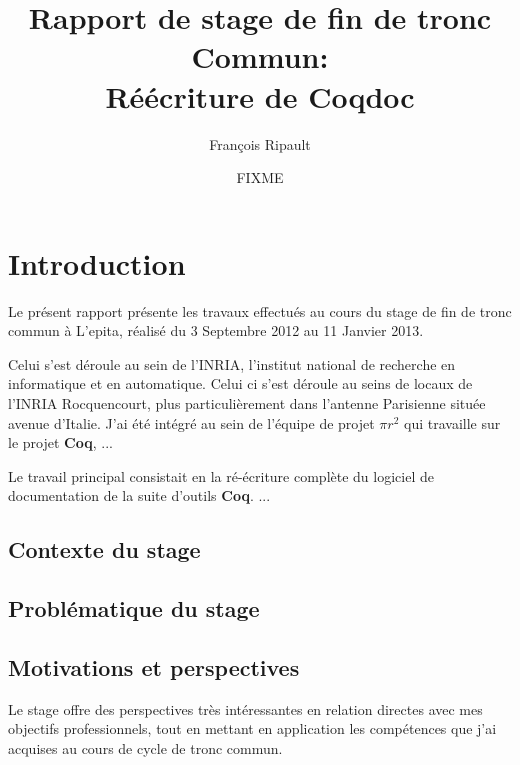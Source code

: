 \documentclass[a4paper, 11pt]{report}
\title{Rapport de stage de fin de tronc Commun: \\
  Réécriture de Coqdoc}
\author{François Ripault}
\date{FIXME}
\newcommand{\pir}[0]{\xspace\textbf{$\pi r^2$}\xspace}
\newcommand{\coq}[0]{\xspace\textbf{Coq}\xspace}
\begin{document}
\maketitle
\thispagestyle{empty}

\tableofcontents
\thispagestyle{empty}

\setcounter{page}{0}
\chapter{Introduction}
  Le présent rapport présente les travaux effectués au cours du stage de fin
  de tronc commun à L'epita, réalisé du 3 Septembre 2012 au 11 Janvier 2013.

  Celui s'est déroule au sein de l'INRIA, l'institut national de recherche en
  informatique et en automatique. Celui ci s'est déroule au seins de locaux
  de l'INRIA Rocquencourt, plus particulièrement dans l'antenne Parisienne
  située avenue d'Italie.
  J'ai été intégré au sein de l'équipe de projet \pir qui travaille sur le
  projet \coq, ... %

  Le travail principal consistait en la ré-écriture complète du logiciel de
  documentation de la suite d'outils \coq. ... %

  \section{Contexte du stage}
  \section{Problématique du stage}
  \section{Motivations et perspectives}
  Le stage offre des perspectives très intéressantes en relation directes
  avec mes objectifs professionnels, tout en mettant en application les
  compétences que j'ai acquises au cours de cycle de tronc commun.
\end{document}

